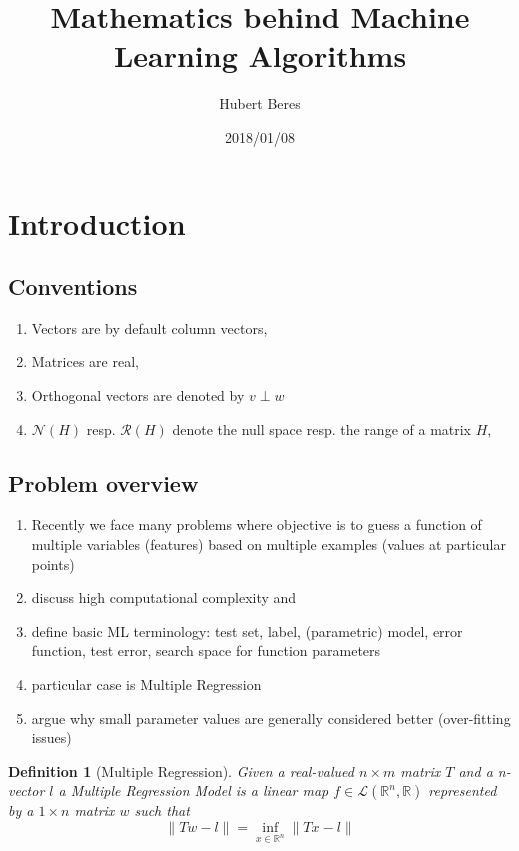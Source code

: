 \documentclass[a4paper]{article}
\title{Mathematics behind Machine Learning Algorithms}
\author{Hubert Beres}
\date{2018/01/08}
\theoremstyle{break}
\newtheorem{definition}{Definition}[section]
\newcommand{\R}{\mathbb{R}}
\newcommand{\Nu}{\mathcal{N}}
\newcommand{\Ra}{\mathcal{R}}
\begin{document}
\maketitle

\section{Introduction}
\subsection{Conventions}
\begin{enumerate}
    \item Vectors are by default column vectors,
    \item Matrices are real,
    \item Orthogonal vectors are denoted by $ v \perp w$
    \item $\Nu(H)$ resp. $\Ra(H)$ denote the null space resp. the range of a matrix $H$, 
\end{enumerate}
\subsection{Problem overview}
\begin{enumerate}
    \item Recently we face many problems where objective is to guess a function of multiple variables (features) based on multiple examples (values at particular points)
    \item discuss high computational complexity and 
    \item define basic ML terminology: test set, label, (parametric) model, error function, test error, search space for function parameters
    \item particular case is Multiple Regression
    \item argue why small parameter values are generally considered better (over-fitting issues)

\end{enumerate}

\begin{definition}[Multiple Regression]
    Given a real-valued $ n \times m$ matrix $T$ and a n-vector $l$ a Multiple Regression Model is a linear map $f \in \mathcal{L} ( \R ^n, \R)$ represented by a $ 1 \times n$ matrix $w$ such that
    \begin{equation}
        \| T w - l \| = \inf\limits_{x \in \R^n} \| T x - l \|
    \end{equation}
\end{definition}    
\end{document}
